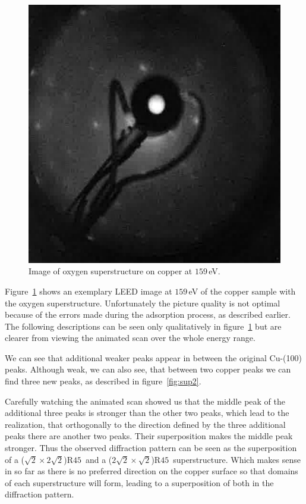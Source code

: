 \documentclass[a4paper,10pt]{scrartcl}
\begin{document}
\begin{figure}
\centering
\includegraphics[scale=0.4]{img/img_o2_159eV}
\caption{Image of oxygen superstructure on copper at $159\,$eV. \label{fig:imgo2}}
\end{figure}

Figure~\ref{fig:imgo2} shows an exemplary LEED image at $159\,$eV of the copper sample with the oxygen superstructure. Unfortunately the picture quality is not optimal because of the errors made during the adsorption process, as described earlier. The following descriptions can be seen only qualitatively in figure~\ref{fig:imgo2} but are clearer from viewing the animated scan over the whole energy range.

We can see that additional weaker peaks appear in between the original Cu-(100) peaks. Although weak, we can also see, that between two copper peaks we can find three new peaks, as described in figure~\ref{fig:sup2}. 

Carefully watching the animated scan showed us that the middle peak of the additional three peaks is stronger than the other two peaks, which lead to the realization, that orthogonally to the direction defined by the three additional peaks there are another two peaks. Their superposition makes the middle peak stronger. Thus the observed diffraction pattern can be seen as the superposition of a ($\sqrt{2} \times 2\sqrt{2}$)R$45$\textdegree~and a ($2\sqrt{2} \times \sqrt{2}$)R$45$\textdegree~superstructure. Which makes sense in so far as there is no preferred direction on the copper surface so that domains of each superstructure will form, leading to a superposition of both in the diffraction pattern.
\end{document}
